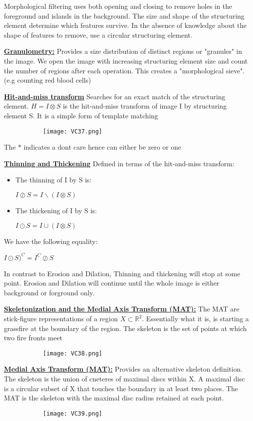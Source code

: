 \documentclass[8pt]{extreport}
\begin{document}
Morphological filtering uses both opening and closing to remove holes in the foreground and islands in the background. The size and shape of the structuring element determine which features survive. In the absence of knowledge about the shape of features to remove, use a circular structuring element.

\underline{\textbf{Granulometry:}} Provides a size distribution of distinct regions or "granules" in the image. We open the image with increasing structuring element size and count the number of regions after each operation. This creates a "morphological sieve". (e.g counting red blood cells)

\underline{\textbf{Hit-and-miss transform}} Searches for an exact match of the structuring element. $H = I \otimes S$ is the hit-and-miss transform of image I by structuring element S. It is a simple form of template matching
\begin{figure}[H]
\centering
\begin{subfigure}[b]{0.32\linewidth}
\texttt{[image: VC37.png]}
\end{subfigure}
\end{figure}
The $*$ indicates a dont care hence can either be zero or one

\underline{\textbf{Thinning and Thickening}} Defined in terms of the hit-and-miss transform:
\begin{itemize}
\item The thinning of I by S is:
\begin{center}
$ I \oslash S = I\backslash (I \otimes S)$
\end{center}
\item The thickening of I by S is:
\begin{center}
$ I \odot S = I \cup (I \otimes S)$
\end{center}
\end{itemize}
We have the following equality:
\begin{center}
$I \odot S)^C = I^C \oslash S$
\end{center}
In contrast to Erosion and Dilation, Thinning and thickening will stop at some point. Erosion and Dilation will continue until the whole image is either background or forground only. 

\underline{\textbf{Skeletonization and the Medial Axis Transform (MAT):}} The MAT are stick-figure representations of a region $X \subset \mathbb{R}^2$. Essentially what it is, is starting a grassfire at the boundary of the region. The skeleton is the set of points at which two fire fronts meet
\begin{figure}[H]
\centering
\begin{subfigure}[b]{0.32\linewidth}
\texttt{[image: VC38.png]}
\end{subfigure}
\end{figure}
\underline{\textbf{Medial Axis Transform (MAT):}} Provides an alternative skeleton definition. The skeleton is the union of cneteres of maximal discs within X. A maximal disc is a circular subset of X that touches the boundary in at least two places. The MAT is the skeleton with the maximal disc radius retained at each point.

\begin{figure}[H]
\centering
\begin{subfigure}[b]{0.32\linewidth}
\texttt{[image: VC39.png]}
\end{subfigure}
\end{figure}
 
\end{document}
